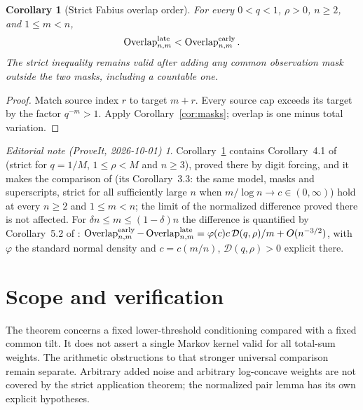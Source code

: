 \documentclass[11pt,a4paper]{article}
\newtheorem{corollary}[theorem]{Corollary}\newtheorem{proposition}[theorem]{Proposition}
\theoremstyle{remark}\newtheorem*{ednote}{Editorial note (ProveIt, 2026-10-01)}
\begin{document}
\begin{corollary}[Strict Fabius overlap order]\label{cor:fabius}
For every $0<q<1$, $\rho>0$, $n\ge2$, and $1\le m<n$,
\begin{equation}
 \operatorname{Overlap}^{\rm late}_{n,m}
 <\operatorname{Overlap}^{\rm early}_{n,m}.
\end{equation}
The strict inequality remains valid after adding any common observation mask outside the two masks, including a countable one.
\end{corollary}
\begin{proof}
Match source index $r$ to target $m+r$. Every source cap exceeds its target by the factor $q^{-m}>1$. Apply Corollary~\ref{cor:masks}; overlap is one minus total variation.
\end{proof}
\begin{ednote}
Corollary~\ref{cor:fabius} contains Corollary~4.1 of
 (strict for $q=1/M$, $1\le\rho<M$ and
$n\ge3$), proved there by digit forcing, and it makes the comparison of
 (its
Corollary~3.3: the same model, masks and superscripts, strict for all
sufficiently large $n$ when $m/\log n\to c\in(0,\infty)$) hold at every
$n\ge2$ and $1\le m<n$; the limit of the normalized difference proved there is
not affected. For $\delta n\le m\le(1-\delta)n$ the difference is quantified
by Corollary~5.2 of :
$\operatorname{Overlap}^{\rm early}_{n,m}-\operatorname{Overlap}^{\rm
late}_{n,m}=\varphi(c)c\,\mathcal D(q,\rho)/m+O(n^{-3/2})$, with $\varphi$ the
standard normal density and $c=c(m/n)$, $\mathcal D(q,\rho)>0$ explicit there.
\end{ednote}

\section{Scope and verification}
The theorem concerns a fixed lower-threshold conditioning compared with a fixed common tilt. It does not assert a single Markov kernel valid for all total-sum weights. The arithmetic obstructions to that stronger universal comparison remain separate. Arbitrary added noise and arbitrary log-concave weights are not covered by the strict application theorem; the normalized pair lemma has its own explicit hypotheses.
\end{document}
